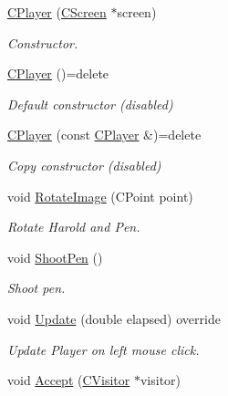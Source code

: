 \begin{DoxyCompactItemize}
\item 
\mbox{\hyperlink{class_c_player_ad48a32c4432da29ef46b3ff6981c122f}{C\+Player}} (\mbox{\hyperlink{class_c_screen}{C\+Screen}} $\ast$screen)
\begin{DoxyCompactList}\small\item\em Constructor. \end{DoxyCompactList}\item 
\mbox{\label{class_c_player_afe4da7254b270820ecd9fbc91e9d8b50}} 
\mbox{\hyperlink{class_c_player_afe4da7254b270820ecd9fbc91e9d8b50}{C\+Player}} ()=delete
\begin{DoxyCompactList}\small\item\em Default constructor (disabled) \end{DoxyCompactList}\item 
\mbox{\label{class_c_player_a8352acf66ff8778a1af3f76b4fafd2f5}} 
\mbox{\hyperlink{class_c_player_a8352acf66ff8778a1af3f76b4fafd2f5}{C\+Player}} (const \mbox{\hyperlink{class_c_player}{C\+Player}} \&)=delete
\begin{DoxyCompactList}\small\item\em Copy constructor (disabled) \end{DoxyCompactList}\item 
void \mbox{\hyperlink{class_c_player_a5e44aa329b892f90bf8eb7aa38155d50}{Rotate\+Image}} (C\+Point point)
\begin{DoxyCompactList}\small\item\em Rotate Harold and Pen. \end{DoxyCompactList}\item 
void \mbox{\hyperlink{class_c_player_a6cd750cb5f29c4d8615c936ab537a8c2}{Shoot\+Pen}} ()
\begin{DoxyCompactList}\small\item\em Shoot pen. \end{DoxyCompactList}\item 
void \mbox{\hyperlink{class_c_player_a0a17b9e8c553dcf8a97b5ed6070ad560}{Update}} (double elapsed) override
\begin{DoxyCompactList}\small\item\em Update Player on left mouse click. \end{DoxyCompactList}\item 
void \mbox{\hyperlink{class_c_player_a524a0fd1d55d4ac0a55d00d0492018f8}{Accept}} (\mbox{\hyperlink{class_c_visitor}{C\+Visitor}} $\ast$visitor)

\end{DoxyCompactItemize}
